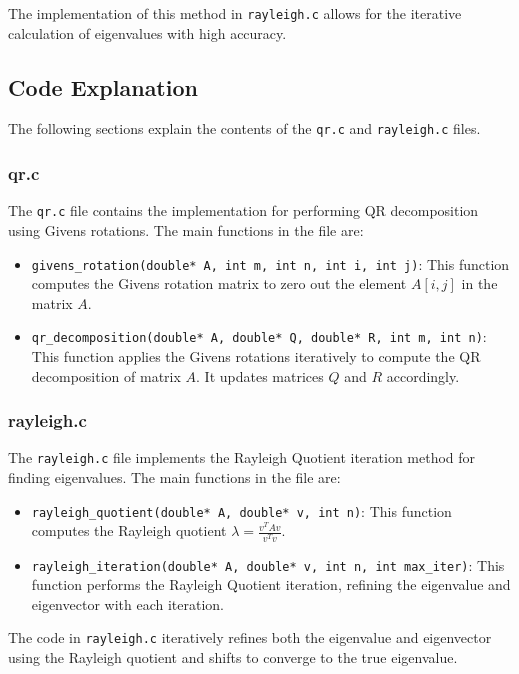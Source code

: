 \documentclass[a4paper,12pt]{article}
\theoremstyle{remark}
\begin{document}
The implementation of this method in \texttt{rayleigh.c} allows for the iterative calculation of eigenvalues with high accuracy.

\subsection{Code Explanation}
The following sections explain the contents of the \texttt{qr.c} and \texttt{rayleigh.c} files.

\subsubsection{qr.c}
The \texttt{qr.c} file contains the implementation for performing QR decomposition using Givens rotations. The main functions in the file are:

\begin{itemize}
    \item \texttt{givens\_rotation(double* A, int m, int n, int i, int j)}: This function computes the Givens rotation matrix to zero out the element \( A[i,j] \) in the matrix \( A \).
    \item \texttt{qr\_decomposition(double* A, double* Q, double* R, int m, int n)}: This function applies the Givens rotations iteratively to compute the QR decomposition of matrix \( A \). It updates matrices \( Q \) and \( R \) accordingly.
\end{itemize}

\subsubsection{rayleigh.c}
The \texttt{rayleigh.c} file implements the Rayleigh Quotient iteration method for finding eigenvalues. The main functions in the file are:

\begin{itemize}
    \item \texttt{rayleigh\_quotient(double* A, double* v, int n)}: This function computes the Rayleigh quotient \( \lambda = \frac{v^T A v}{v^T v} \).
    \item \texttt{rayleigh\_iteration(double* A, double* v, int n, int max\_iter)}: This function performs the Rayleigh Quotient iteration, refining the eigenvalue and eigenvector with each iteration.
\end{itemize}

The code in \texttt{rayleigh.c} iteratively refines both the eigenvalue and eigenvector using the Rayleigh quotient and shifts to converge to the true eigenvalue.
\end{document}
